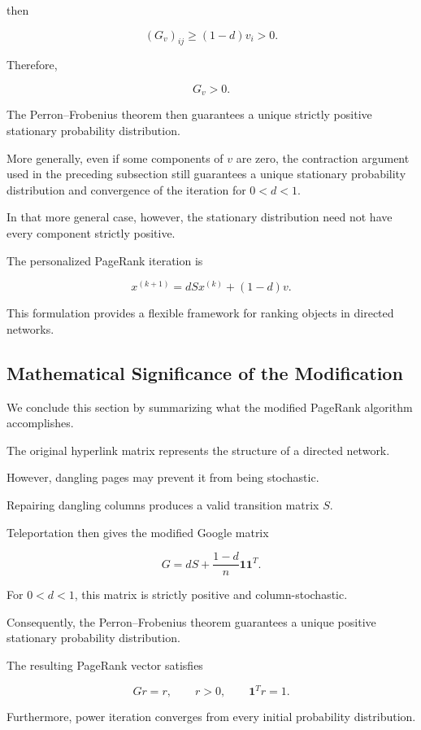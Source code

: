 \documentclass[11pt,a4paper]{article}
\theoremstyle{definition}
\theoremstyle{remark}
\begin{document}
then

\[
(G_v)_{ij}
\geq(1-d)v_i>0.
\]

Therefore,

\[
G_v>0.
\]

The Perron--Frobenius
theorem then guarantees
a unique strictly
positive stationary
probability distribution.

More generally, even
if some components
of $v$ are zero,
the contraction argument
used in the preceding
subsection still guarantees
a unique stationary
probability distribution
and convergence of the
iteration for $0<d<1$.

In that more general
case, however, the
stationary distribution
need not have every
component strictly positive.

The personalized
PageRank iteration is

\begin{equation}
\boxed{
x^{(k+1)}
=
dSx^{(k)}+(1-d)v.
}
\label{eq:personalized_pagerank_iteration}
\end{equation}

This formulation
provides a flexible
framework for ranking
objects in directed
networks.


\subsection{Mathematical Significance
of the Modification}

We conclude this section
by summarizing what
the modified PageRank
algorithm accomplishes.

The original hyperlink
matrix represents
the structure of
a directed network.

However, dangling pages
may prevent it from
being stochastic.

Repairing dangling columns
produces a valid
transition matrix $S$.

Teleportation then gives
the modified Google matrix

\[
G=
dS+
\frac{1-d}{n}
\mathbf{1}\mathbf{1}^T.
\]

For $0<d<1$,
this matrix is
strictly positive
and column-stochastic.

Consequently, the
Perron--Frobenius theorem
guarantees a unique
positive stationary
probability distribution.

The resulting PageRank
vector satisfies

\[
\boxed{
Gr=r,
\qquad
r>0,
\qquad
\mathbf{1}^Tr=1.
}
\]

Furthermore, power iteration
converges from every
initial probability distribution.
\end{document}
